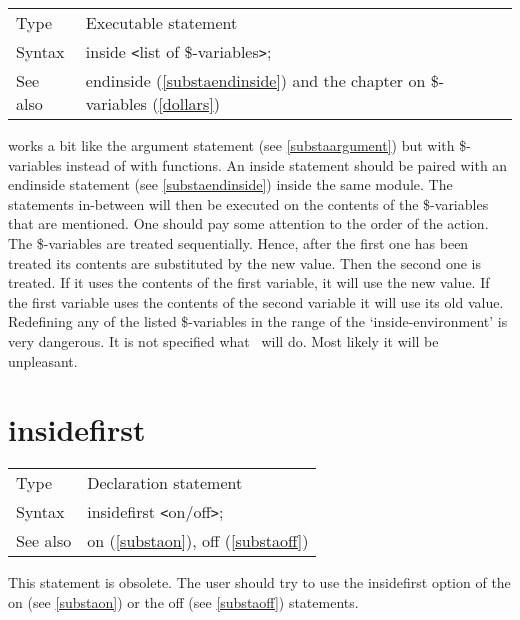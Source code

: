 \noindent \begin{tabular}{ll}
Type & Executable statement\\
Syntax & inside {\tt<}list of \$-variables{\tt>};
\\ See also & endinside (\ref{substaendinside}) and the chapter on \$-variables 
(\ref{dollars})
\end{tabular} \vspace{4mm}

\noindent works a bit like the argument 
statement (see \ref{substaargument}) but with 
\$-variables instead of with functions. An inside 
statement should be paired with an endinside statement 
(see \ref{substaendinside}) inside the same module. The statements 
in-between will then be executed on the contents of the \$-variables that 
are mentioned. One should pay some attention to the order of the action. 
The \$-variables are treated sequentially. Hence, after the first one has 
been treated its contents are substituted by the new value. Then the second 
one is treated. If it uses the contents of the first variable, it will use 
the new value. If the first variable uses the contents of the second 
variable it will use its old value. Redefining any of the listed 
\$-variables in the range of the `inside-environment' is very dangerous. It 
is not specified what \FORM\ will do. Most likely it will be 
unpleasant. 
\vspace{10mm}


\section{insidefirst}
\label{substainsidefirst}

\noindent \begin{tabular}{ll}
Type & Declaration statement\\
Syntax & insidefirst {\tt<}on/off{\tt>};
\\ See also & on (\ref{substaon}), off (\ref{substaoff})
\end{tabular} \vspace{4mm}

\noindent This statement is obsolete. 
The user should try to use the insidefirst option of the on (see 
\ref{substaon}) or the off (see \ref{substaoff}) statements. \vspace{10mm}

